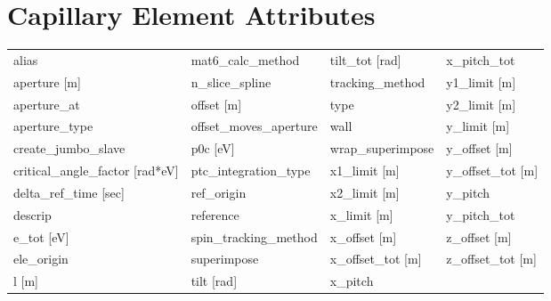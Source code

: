 \begin{tabular}{llll} \toprule
 \bottomrule
 \end{tabular}
 \vfill
 
 \section{Capillary Element Attributes}
 \label{s:list.capillary}
 
 \begin{tabular}{llll} \toprule
alias                            & mat6_calc_method                 & tilt_tot [rad]                   & x_pitch_tot                      \\
aperture [m]                     & n_slice_spline                   & tracking_method                  & y1_limit [m]                     \\
aperture_at                      & offset [m]                       & type                             & y2_limit [m]                     \\
aperture_type                    & offset_moves_aperture            & wall                             & y_limit [m]                      \\
create_jumbo_slave               & p0c [eV]                         & wrap_superimpose                 & y_offset [m]                     \\
critical_angle_factor [rad*eV]   & ptc_integration_type             & x1_limit [m]                     & y_offset_tot [m]                 \\
delta_ref_time [sec]             & ref_origin                       & x2_limit [m]                     & y_pitch                          \\
descrip                          & reference                        & x_limit [m]                      & y_pitch_tot                      \\
e_tot [eV]                       & spin_tracking_method             & x_offset [m]                     & z_offset [m]                     \\
ele_origin                       & superimpose                      & x_offset_tot [m]                 & z_offset_tot [m]                 \\
l [m]                            & tilt [rad]                       & x_pitch                          &                                  \\
 \bottomrule
 \end{tabular}
 \vfill
 
